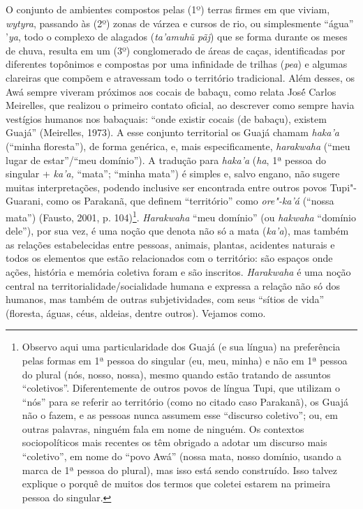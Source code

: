 O conjunto de ambientes compostos pelas (1º) terras firmes em que
viviam, \emph{wytyra}, passando às (2º) zonas de várzea e cursos de rio,
ou simplesmente ``água'' '\emph{ya}, todo o complexo de alagados
(\emph{ta'amuhũ pãj}) que se forma durante os meses de chuva, resulta em
um (3º) conglomerado de áreas de caças, identificadas por diferentes
topônimos e compostas por uma infinidade de trilhas (\emph{pea}) e
algumas clareiras que compõem e atravessam todo o território
tradicional. Além desses, os Awá sempre viveram próximos aos cocais de
babaçu, como relata José́ Carlos Meirelles, que realizou o primeiro
contato oficial, ao descrever como sempre havia vestígios humanos nos
babaçuais: ``onde existir cocais (de babaçu), existem Guajá''
(Meirelles, 1973). A esse conjunto territorial os Guajá chamam
\emph{haka'a} (``minha floresta''), de forma genérica, e, mais
especificamente, \emph{harakwaha} (``meu lugar de estar''/``meu
domínio''). A tradução para \emph{haka'a} (\emph{ha}, 1ª pessoa do
singular + \emph{ka'a,} ``mata''; ``minha mata'') é simples e, salvo
engano, não sugere muitas interpretações, podendo inclusive ser
encontrada entre outros povos Tupi"-Guarani, como os Parakanã, que
definem ``território'' como \emph{ore"-ka'á} (``nossa mata'') (Fausto,
2001, p. 104)\footnote{Observo aqui uma particularidade dos Guajá (e sua
  língua) na preferência pelas formas em 1ª pessoa do singular (eu, meu,
  minha) e não em 1ª pessoa do plural (nós, nosso, nossa), mesmo quando
  estão tratando de assuntos ``coletivos''. Diferentemente de outros
  povos de língua Tupi, que utilizam o ``nós'' para se referir ao
  território (como no citado caso Parakanã), os Guajá não o fazem, e as
  pessoas nunca assumem esse ``discurso coletivo''; ou, em outras
  palavras, ninguém fala em nome de ninguém. Os contextos sociopolíticos
  mais recentes os têm obrigado a adotar um discurso mais ``coletivo'',
  em nome do ``povo Awá'' (nossa mata, nosso domínio, usando a marca de
  1ª pessoa do plural), mas isso está sendo construído. Isso talvez
  explique o porquê de muitos dos termos que coletei estarem na primeira
  pessoa do singular.}. \emph{Harakwaha} ``meu domínio'' (ou
\emph{hakwaha} ``domínio dele''), por sua vez, é uma noção que denota
não só a mata (\emph{ka'a}), mas também as relações estabelecidas entre
pessoas, animais, plantas, acidentes naturais e todos os elementos que
estão relacionados com o território: são espaços onde ações, história e
memória coletiva foram e são inscritos. \emph{Harakwaha} é uma noção
central na territorialidade/socialidade humana e expressa a relação não
só dos humanos, mas também de outras subjetividades, com seus ``sítios
de vida'' (floresta, águas, céus, aldeias, dentre outros). Vejamos como.

